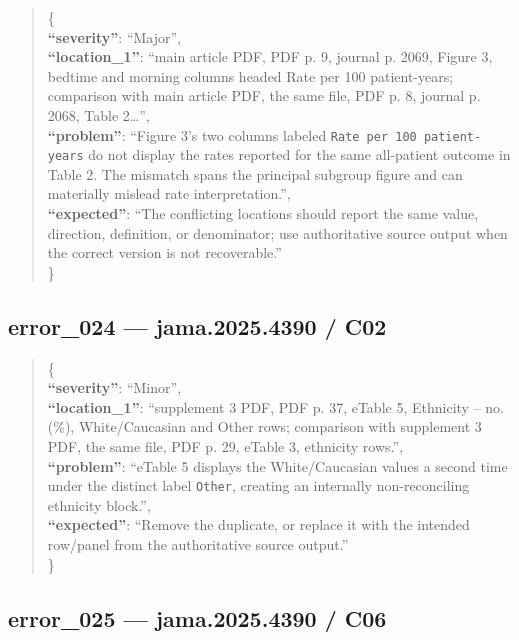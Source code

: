 \documentclass[
  letterpaper,
  9pt]{extreport}
\begin{document}
\begin{quote}
\{\\
\textbf{``severity''}: ``Major'',\\
\textbf{``location\_1''}: ``main article PDF, PDF p. 9, journal p. 2069,
Figure 3, bedtime and morning columns headed Rate per 100 patient-years;
comparison with main article PDF, the same file, PDF p. 8, journal p.
2068, Table 2\ldots{}'',\\
\textbf{``problem''}: ``Figure 3's two columns labeled
\texttt{Rate\ per\ 100\ patient-years} do not display the rates reported
for the same all-patient outcome in Table 2. The mismatch spans the
principal subgroup figure and can materially mislead rate
interpretation.'',\\
\textbf{``expected''}: ``The conflicting locations should report the
same value, direction, definition, or denominator; use authoritative
source output when the correct version is not recoverable.''\\
\}
\end{quote}

\hypertarget{error_024--jama20254390--c02}{%
\subsection{error\_024 --- jama.2025.4390 /
C02}\label{error_024--jama20254390--c02}}

\begin{quote}
\{\\
\textbf{``severity''}: ``Minor'',\\
\textbf{``location\_1''}: ``supplement 3 PDF, PDF p. 37, eTable 5,
Ethnicity -- no. (\%), White/Caucasian and Other rows; comparison with
supplement 3 PDF, the same file, PDF p. 29, eTable 3, ethnicity
rows.'',\\
\textbf{``problem''}: ``eTable 5 displays the White/Caucasian values a
second time under the distinct label \texttt{Other}, creating an
internally non-reconciling ethnicity block.'',\\
\textbf{``expected''}: ``Remove the duplicate, or replace it with the
intended row/panel from the authoritative source output.''\\
\}
\end{quote}

\hypertarget{error_025--jama20254390--c06}{%
\subsection{error\_025 --- jama.2025.4390 /
C06}\label{error_025--jama20254390--c06}}
\end{document}

